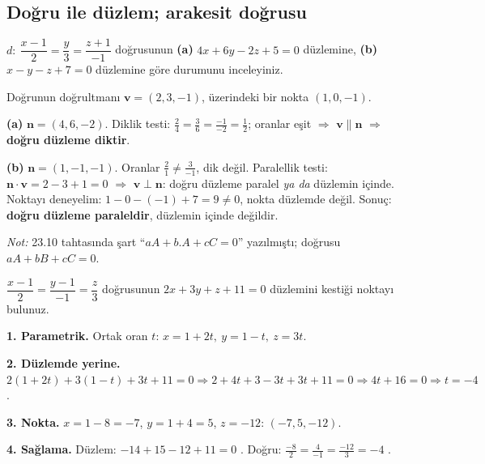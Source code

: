 \subsection{Doğru ile düzlem; arakesit doğrusu}

\begin{soru}
$d:\ \dfrac{x-1}{2}=\dfrac{y}{3}=\dfrac{z+1}{-1}$ doğrusunun
\textbf{(a)} $4x+6y-2z+5=0$ düzlemine,
\textbf{(b)} $x-y-z+7=0$ düzlemine göre durumunu inceleyiniz.
\end{soru}
\begin{cevap}
Doğrunun doğrultmanı $\mathbf v=(2,3,-1)$, üzerindeki bir nokta $(1,0,-1)$.

\textbf{(a)} $\mathbf n=(4,6,-2)$. Diklik testi: $\frac24=\frac36=\frac{-1}{-2}=\frac12$; oranlar eşit $\Rightarrow$ $\mathbf v\parallel\mathbf n$ $\Rightarrow$ \textbf{doğru düzleme diktir}.

\textbf{(b)} $\mathbf n=(1,-1,-1)$. Oranlar $\frac21\neq\frac3{-1}$, dik değil. Paralellik testi: $\mathbf n\cdot\mathbf v=2-3+1=0$ $\Rightarrow$ $\mathbf v\perp\mathbf n$: doğru düzleme paralel \emph{ya da} düzlemin içinde. Noktayı deneyelim: $1-0-(-1)+7=9\neq0$, nokta düzlemde değil. Sonuç: \textbf{doğru düzleme paraleldir}, düzlemin içinde değildir.

\textit{Not:} 23.10 tahtasında şart ``$aA+b.A+cC=0$'' yazılmıştı; doğrusu $aA+bB+cC=0$.
\end{cevap}

\begin{soru}
$\dfrac{x-1}{2}=\dfrac{y-1}{-1}=\dfrac{z}{3}$ doğrusunun $2x+3y+z+11=0$ düzlemini kestiği noktayı bulunuz.
\end{soru}
\begin{cevap}
\textbf{1. Parametrik.} Ortak oran $t$: $x=1+2t,\ y=1-t,\ z=3t$.

\textbf{2. Düzlemde yerine.} $2(1+2t)+3(1-t)+3t+11=0\Rightarrow2+4t+3-3t+3t+11=0\Rightarrow4t+16=0\Rightarrow t=-4$.

\textbf{3. Nokta.} $x=1-8=-7$, $y=1+4=5$, $z=-12$: $\boxed{(-7,5,-12)}$.

\textbf{4. Sağlama.} Düzlem: $-14+15-12+11=0$ \checkmark. Doğru: $\frac{-8}{2}=\frac{4}{-1}=\frac{-12}{3}=-4$ \checkmark.
\end{cevap}

